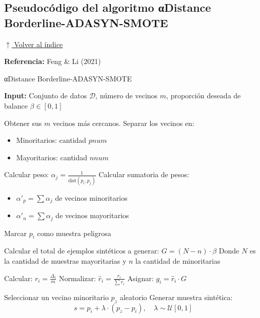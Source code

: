 \subsection{Pseudocódigo del algoritmo αDistance Borderline-ADASYN-SMOTE}
\noindent\hyperlink{toc}{\small$\uparrow$ Volver al índice}

\textbf{Referencia:} Feng \& Li (2021)

\begin{algorithm}[H]
\caption{αDistance Borderline-ADASYN-SMOTE}
\begin{algorithmic}[1]
\State \textbf{Input:} Conjunto de datos $\mathcal{D}$, número de vecinos $m$, proporción deseada de balance $\beta \in [0, 1]$
\Statex

    \State Obtener sus $m$ vecinos más cercanos.
    \State Separar los vecinos en:
    \begin{itemize}
        \item Minoritarios: cantidad $pnum$
        \item Mayoritarios: cantidad $nnum$
    \end{itemize}
        \State Calcular peso: $\alpha_j = \frac{1}{\text{dist}(p_i, p_j)}$
    \EndFor
    \State Calcular sumatoria de pesos:
    \begin{itemize}
        \item $\alpha'_p = \sum \alpha_j$ de vecinos minoritarios
        \item $\alpha'_n = \sum \alpha_j$ de vecinos mayoritarios
    \end{itemize}
        \State Marcar $p_i$ como muestra peligrosa
    \EndIf
\EndFor

\vspace{1em}
\State Calcular el total de ejemplos sintéticos a generar: $G = (N - n) \cdot \beta$
\Statex Donde $N$ es la cantidad de muestras mayoritarias y $n$ la cantidad de minoritarias

\vspace{1em}
    \State Calcular: $r_i = \frac{\Delta_i}{m}$
    \State Normalizar: $\hat{r}_i = \frac{r_i}{\sum r_i}$
    \State Asignar: $g_i = \hat{r}_i \cdot G$
\EndFor

\vspace{1em}
        \State Seleccionar un vecino minoritario $p_z$ aleatorio
        \State Generar muestra sintética:
        \[
        s = p_i + \lambda \cdot (p_z - p_i), \quad \lambda \sim \mathcal{U}[0, 1]
        \]
    \EndFor
\EndFor
\end{algorithmic}
\end{algorithm}

